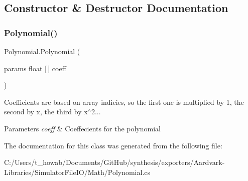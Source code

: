 \subsection{Constructor \& Destructor Documentation}
\mbox{\label{class_polynomial_ad2d3944cfa448882204a0e698c2aa8c9}} 
\subsubsection{\texorpdfstring{Polynomial()}{Polynomial()}}
{\footnotesize\ttfamily Polynomial.\+Polynomial (\begin{DoxyParamCaption}\item[{params float \mbox{[}$\,$\mbox{]}}]{coeff }\end{DoxyParamCaption})}



Coefficients are based on array indicies, so the first one is multiplied by 1, the second by x, the third by x$^\wedge$2... 


\begin{DoxyParams}{Parameters}
{\em coeff} & Coeffecients for the polynomial\\
\hline
\end{DoxyParams}


The documentation for this class was generated from the following file\+:\begin{DoxyCompactItemize}
\item 
C\+:/\+Users/t\+\_\+howab/\+Documents/\+Git\+Hub/synthesis/exporters/\+Aardvark-\/\+Libraries/\+Simulator\+File\+I\+O/\+Math/Polynomial.\+cs\end{DoxyCompactItemize}
